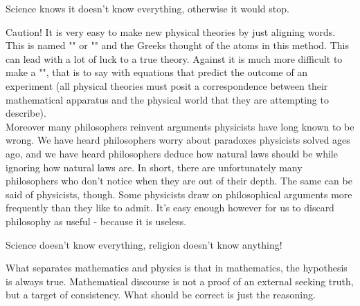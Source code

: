 	\begin{fquote}Science knows it doesn't know everything, otherwise it would stop.
 	\end{fquote}

	\begin{tcolorbox}[enhanced,colback=red!5!white,colframe=black!50!red,boxrule=1pt,arc=0pt,outer arc=0pt,drop lifted shadow,after skip=10pt plus 2pt]
	\bcbombe Caution! It is very easy to make new physical theories by just aligning words. This is named "" or "" and the Greeks thought of the atoms in this method. This can lead with a lot of luck to a true theory. Against it is much more difficult to make a "", that is to say with equations that predict the outcome of an experiment (all physical theories must posit a correspondence between their mathematical apparatus and the physical world that they are attempting to describe).\\
	
	Moreover many philosophers reinvent arguments physicists have long known to be wrong. We have heard philosophers worry about paradoxes physicists solved ages ago, and we have heard philosophers deduce how natural laws should be while ignoring how natural laws are. In short, there are unfortunately many philosophers who don't notice when they are out of their depth. The same can be said of physicists, though. Some physicists draw on philosophical arguments more frequently than they like to admit. It's easy enough however for us to discard philosophy as useful - because it is useless.
	\end{tcolorbox}
	
	\begin{fquote}Science doesn't know everything, religion doesn't know anything!
 	\end{fquote}

	\begin{tcolorbox}[title=Remark,arc=10pt,breakable,drop lifted shadow,
  skin=enhanced,
  skin first is subskin of={enhancedfirst}{arc=10pt,no shadow},
  skin middle is subskin of={enhancedmiddle}{arc=10pt,no shadow},
  skin last is subskin of={enhancedlast}{drop lifted shadow}]
	What separates mathematics and physics is that in mathematics, the hypothesis is always true. Mathematical discourse is not a proof of an external seeking truth, but a target of consistency. What should be correct is just the reasoning. 
	\end{tcolorbox}
	
